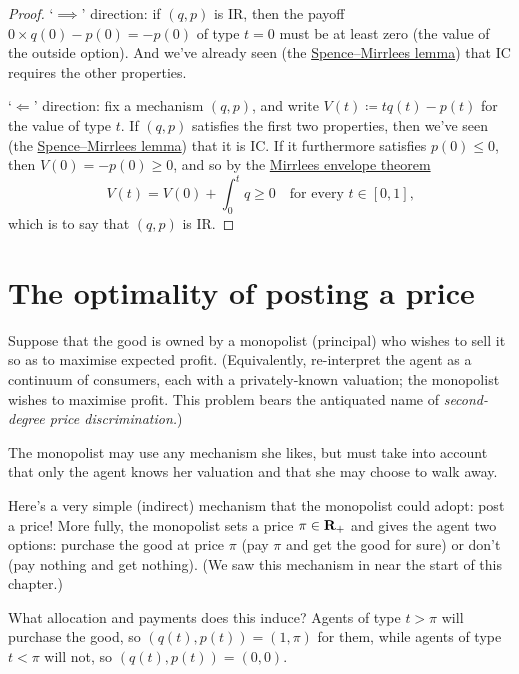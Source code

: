 \begin{proof}
	`$\implies$' direction:
	if $(q,p)$ is IR, then the payoff $0 \times q(0) - p(0) = -p(0)$ of type $t=0$ must be at least zero (the value of the outside option).
	And we've already seen (the \hyperref[proposition:SM_lemma]{Spence--Mirrlees lemma}) that IC requires the other properties.

	`$\Longleftarrow$' direction:
	fix a mechanism $(q,p)$, and
	write $V(t) \coloneqq t q(t) - p(t)$ for the value of type $t$.
	If $(q,p)$ satisfies the first two properties, then we've seen (the \hyperref[proposition:SM_lemma]{Spence--Mirrlees lemma}) that it is IC.
	If it furthermore satisfies $p(0) \leq 0$,
	then $V(0) = -p(0) \geq 0$,
	and so by the \hyperref[proposition:ic_env]{Mirrlees envelope theorem}
	\begin{equation*}
		V(t) = V(0) + \int_0^t q \geq 0 
		\quad \text{for every $t \in [0,1]$,}
	\end{equation*}
	which is to say that $(q,p)$ is IR.
\end{proof}



\section{The optimality of posting a price}
\label{sec:ch1:post}

Suppose that the good is owned by a monopolist (principal) who wishes to sell it so as to maximise expected profit.
(Equivalently, re-interpret the agent as a continuum of consumers, each with a privately-known valuation; the monopolist wishes to maximise profit. This problem bears the antiquated name of \emph{second-degree price discrimination.})

The monopolist may use any mechanism she likes, but must take into account that only the agent knows her valuation and that she may choose to walk away.

Here's a very simple (indirect) mechanism that the monopolist could adopt: post a price!
More fully, the monopolist sets a price $\pi \in \mathbf{R}_+$
and gives the agent two options:
purchase the good at price $\pi$ (pay $\pi$ and get the good for sure)
or don't (pay nothing and get nothing). (We saw this mechanism in  near the start of this chapter.)

What allocation and payments does this induce?
Agents of type $t > \pi$ will purchase the good, so $(q(t),p(t)) = (1,\pi)$ for them, while agents of type $t < \pi$ will not, so $(q(t),p(t)) = (0,0)$.

